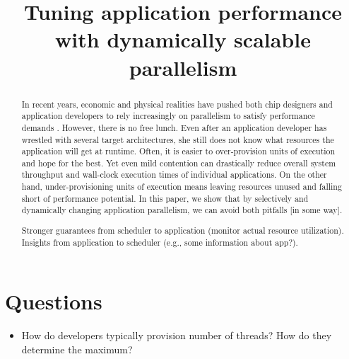 \documentclass[10pt,preprint]{sigplanconf}
\date{}
\begin{document}
\title{Tuning application performance with dynamically scalable parallelism}
\maketitle

\begin{abstract}
In recent years, economic and physical realities have pushed both chip designers and application developers to rely increasingly on parallelism to satisfy performance demands \cite{mack2011fifty}. However, there is no free lunch. Even after an application developer has wrestled with several target architectures, she still does not know what resources the application will get at runtime. Often, it is easier to over-provision units of execution and hope for the best. Yet even mild contention can drastically reduce overall system throughput and wall-clock execution times of individual applications. On the other hand, under-provisioning units of execution means leaving resources unused and falling short of performance potential. In this paper, we show that by selectively and dynamically changing application parallelism, we can avoid both pitfalls [in some way].


Stronger guarantees from scheduler to application (monitor actual resource utilization). Insights from application to scheduler (e.g., some information about app?).

\end{abstract}

\section{Questions}
\begin{itemize}
  \item How do developers typically provision number of threads? How do they determine the maximum?
\end{itemize}
\end{document}
